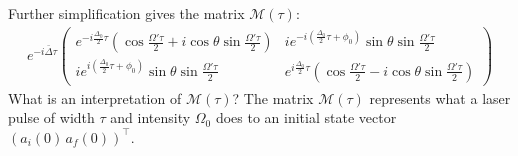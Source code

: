 \documentclass{article}
\begin{document}
Further simplification gives the matrix $\mathcal{M}(\tau)$:
\begin{align}
\boxed{e^{-i\bar{\Delta}\tau}\begin{pmatrix}
e^{-i\frac{\Delta_0}{2}\tau}\left(\cos\frac{\Omega'\tau}{2} + i\cos\theta\sin\frac{\Omega'\tau}{2} \right) & ie^{-i\left( \frac{\Delta_0}{2}\tau + \phi_0\right) }\sin\theta\sin\frac{\Omega'\tau}{2}\\
ie^{i\left( \frac{\Delta_0}{2}\tau + \phi_0\right) }\sin\theta\sin\frac{\Omega'\tau}{2} & e^{i\frac{\Delta_0}{2}\tau}\left(\cos\frac{\Omega'\tau}{2}-i\cos\theta\sin\frac{\Omega'\tau}{2} \right)
\end{pmatrix}}
\end{align}
What is an interpretation of $\mathcal{M}(\tau)$? The matrix $\mathcal{M}(\tau)$ represents what a laser pulse of width $\tau$ and intensity $\Omega_0$ does to an initial state vector $(a_i(0){\,} a_f(0))^\top$.\\
\end{document}
